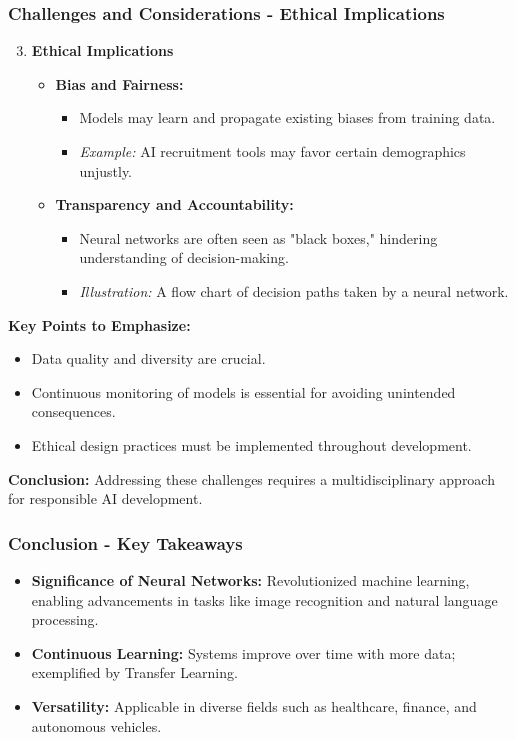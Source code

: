\documentclass[aspectratio=169]{beamer}
\begin{document}
\begin{frame}[fragile]
    \frametitle{Challenges and Considerations - Ethical Implications}
    \begin{enumerate}
        \setcounter{enumi}{2}
        \item \textbf{Ethical Implications}
        \begin{itemize}
            \item \textbf{Bias and Fairness:} 
            \begin{itemize}
                \item Models may learn and propagate existing biases from training data.
                \item \textit{Example:} AI recruitment tools may favor certain demographics unjustly.
            \end{itemize}
            \item \textbf{Transparency and Accountability:} 
            \begin{itemize}
                \item Neural networks are often seen as "black boxes," hindering understanding of decision-making.
                \item \textit{Illustration:} A flow chart of decision paths taken by a neural network.
            \end{itemize}
        \end{itemize}
    \end{enumerate}
    
    \vfill
    \textbf{Key Points to Emphasize:}
    \begin{itemize}
        \item Data quality and diversity are crucial.
        \item Continuous monitoring of models is essential for avoiding unintended consequences.
        \item Ethical design practices must be implemented throughout development.
    \end{itemize}
    
    \textbf{Conclusion:} 
    Addressing these challenges requires a multidisciplinary approach for responsible AI development.
\end{frame}

\begin{frame}[fragile]
    \frametitle{Conclusion - Key Takeaways}
    \begin{itemize}
        \item \textbf{Significance of Neural Networks:} Revolutionized machine learning, enabling advancements in tasks like image recognition and natural language processing.
        \item \textbf{Continuous Learning:} Systems improve over time with more data; exemplified by Transfer Learning.
        \item \textbf{Versatility:} Applicable in diverse fields such as healthcare, finance, and autonomous vehicles.
    \end{itemize}
\end{frame}
\end{document}
